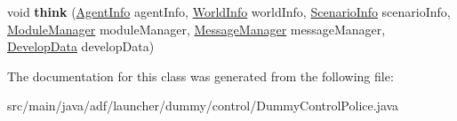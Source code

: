 \begin{DoxyCompactItemize}
\hypertarget{classadf_1_1launcher_1_1dummy_1_1control_1_1DummyControlPolice_a6d8466a2f5428d45fc68ac3399fd5857}{}\label{classadf_1_1launcher_1_1dummy_1_1control_1_1DummyControlPolice_a6d8466a2f5428d45fc68ac3399fd5857} 
void {\bfseries think} (\hyperlink{classadf_1_1agent_1_1info_1_1AgentInfo}{Agent\+Info} agent\+Info, \hyperlink{classadf_1_1agent_1_1info_1_1WorldInfo}{World\+Info} world\+Info, \hyperlink{classadf_1_1agent_1_1info_1_1ScenarioInfo}{Scenario\+Info} scenario\+Info, \hyperlink{classadf_1_1agent_1_1module_1_1ModuleManager}{Module\+Manager} module\+Manager, \hyperlink{classadf_1_1agent_1_1communication_1_1MessageManager}{Message\+Manager} message\+Manager, \hyperlink{classadf_1_1agent_1_1develop_1_1DevelopData}{Develop\+Data} develop\+Data)
\end{DoxyCompactItemize}


The documentation for this class was generated from the following file\+:\begin{DoxyCompactItemize}
\item 
src/main/java/adf/launcher/dummy/control/Dummy\+Control\+Police.\+java\end{DoxyCompactItemize}
